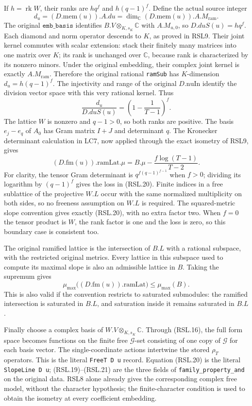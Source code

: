 If $h=\operatorname{rk}W$, their ranks are $h q^f$ and
$h(q-1)^f$.  Define the actual source integer
\[
 d_u=(D.\mathrm{mem}(u)).A.du
      =\dim_{\mathbb C}(D.\mathrm{mem}(u)).A.M_{\mathrm{ram}}.
\]
The original $\texttt{emb\_basis}$ identifies
$B.V\otimes_{K,s_K}\mathbb C$ with $A.M_{u,0}$,
so $D.duS(u)=h q^f$.  Each diamond and norm operator
descends to $K$, as proved in RSL9.  Their joint kernel
commutes with scalar extension: stack their finitely many
matrices into one matrix over $K$; its rank is unchanged
over $\mathbb C$, because rank is characterized by its
nonzero minors.  Under the original embedding, their
complex joint kernel is exactly $A.M_{\mathrm{ram}}$.
Therefore the original rational \texttt{ramSub} has
$K$-dimension $d_u=h(q-1)^f$.  The injectivity and range
of the original $D.\mathrm{nuIn}$ identify the division
vector space with this very rational kernel.  Thus
\[
 \frac{d_u}{D.duS(u)}
       =\left(1-\frac1{T-1}\right)^f.                 \tag{RSL.19}
\]
The lattice $W$ is nonzero and $q-1>0$, so both ranks are
positive.  The basis $e_j-e_q$ of $A_0$ has Gram matrix
$I+J$ and determinant $q$.  The Kronecker determinant
calculation in LC7, now applied through the exact isometry of
RSL9, gives
\[
 \boxed{\quad
 (D.\mathrm{fm}(u)).\mathrm{ramLat}.\mu
       =B.\mu-\frac{f\log(T-1)}{T-2}.
 \quad}                                                          \tag{RSL.20}
\]
For clarity, the tensor Gram determinant is
$q^{f(q-1)^{f-1}}$ when $f>0$; dividing its logarithm by
$(q-1)^f$ gives the loss in (RSL.20).  Finite indices in a
free sublattice of the projective $W.L$ occur with the same
normalized multiplicity on both sides, so no freeness
assumption on $W.L$ is required.  The squared-metric slope
convention gives exactly (RSL.20), with no extra factor two.
When $f=0$ the tensor product is $W$, the rank factor is one
and the loss is zero, so this boundary case is consistent too.

The original ramified lattice is the intersection of $B.L$
with a rational subspace, with the restricted original
metrics.  Every lattice in this subspace used to compute its
maximal slope is also an admissible lattice in $B$.  Taking
the supremum gives
\[
        \mu_{\max}\bigl((D.\mathrm{fm}(u)).\mathrm{ramLat}\bigr)
                           \le\mu_{\max}(B).                     \tag{RSL.21}
\]
This is also valid if the convention restricts to saturated
submodules: the ramified intersection is saturated in $B.L$,
and saturation inside it remains saturated in $B.L$.

Finally choose a complex basis of $W.V\otimes_{K,s_K}\mathbb C$.
Through (RSL.16), the full form space becomes functions on the
finite free $\mathscr G$-set consisting of one copy of
$\mathscr G$ for each basis vector.  The single-coordinate
actions intertwine the stored $\rho_T$ operators.  This is
the literal \texttt{FreeT D u} record.  Equation (RSL.20) is
the literal \texttt{SlopeLine D u}; (RSL.19)--(RSL.21) are
the three fields of \texttt{family\_property\_and} on the
original data.  RSL8 alone already gives the corresponding
complex free model, without the character hypothesis; the
finite-character condition is used to obtain the isometry at
every coefficient embedding.

